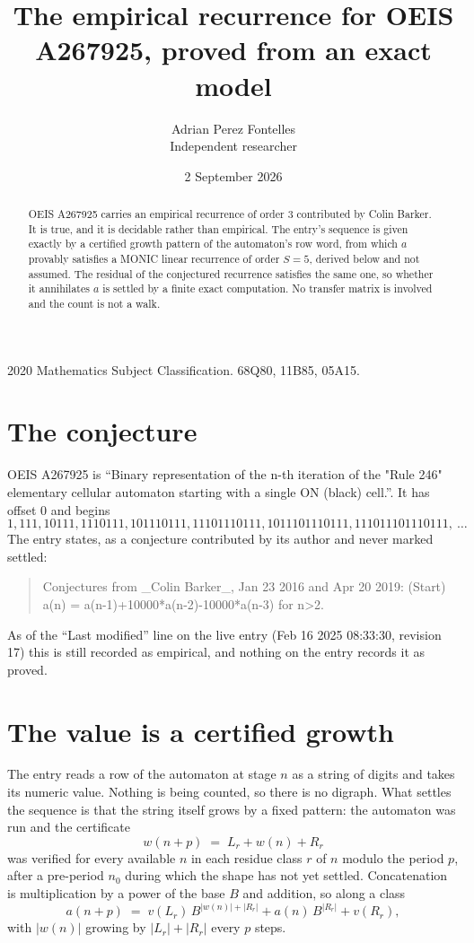 \documentclass[11pt,a4paper]{article}
\title{The empirical recurrence for OEIS A267925, proved from an exact model}
\author{Adrian Perez Fontelles\\ \small Independent researcher}
\date{2 September 2026}
\theoremstyle{plain}
\theoremstyle{definition}
\begin{document}
\maketitle

\begin{abstract}
OEIS A267925 carries an empirical recurrence of order $3$ contributed by Colin Barker. It is true, and it is
decidable rather than empirical. The entry's sequence is given exactly by a certified growth pattern of the automaton's row word, from
which $a$ provably satisfies a MONIC linear recurrence of order $S=5$, derived below and not
assumed. The residual of the conjectured recurrence satisfies the same one, so whether it
annihilates $a$ is settled by a finite exact computation. No transfer matrix is involved and
the count is not a walk.
\end{abstract}

\noindent\small 2020 Mathematics Subject Classification. 68Q80, 11B85, 05A15.\normalsize

\section{The conjecture}

OEIS A267925 is ``Binary representation of the n-th iteration of the "Rule 246" elementary cellular automaton starting with a single ON (black) cell.''. It has offset $0$ and begins
\[
1, 111, 10111, 1110111, 101110111, 11101110111, 1011101110111, 111011101110111,\ \dots
\]
The entry states, as a conjecture contributed by its author and never marked settled:
\begin{quote}
Conjectures from \_Colin Barker\_, Jan 23 2016 and Apr 20 2019: (Start) a(n) = a(n-1)+10000*a(n-2)-10000*a(n-3) for n>2.
\end{quote}
As of the ``Last modified'' line on the live entry (Feb 16 2025 08:33:30, revision 17)
this is still recorded as empirical, and nothing on the entry records it as proved.

\section{The value is a certified growth}

The entry reads a row of the automaton at stage $n$ as a string of digits and takes its
numeric value. Nothing is being counted, so there is no digraph. What settles the sequence is
that the string itself grows by a fixed pattern: the automaton was run and the certificate
\[
w(n+p)\;=\;L_r + w(n) + R_r
\]
was verified for every available $n$ in each residue class $r$ of $n$ modulo the period $p$,
after a pre-period $n_0$ during which the shape has not yet settled. Concatenation is
multiplication by a power of the base $B$ and addition, so along a class
\[
a(n+p)\;=\;v(L_r)\,B^{|w(n)|+|R_r|} + a(n)\,B^{|R_r|} + v(R_r),
\]
with $|w(n)|$ growing by $|L_r|+|R_r|$ every $p$ steps.
\end{document}
